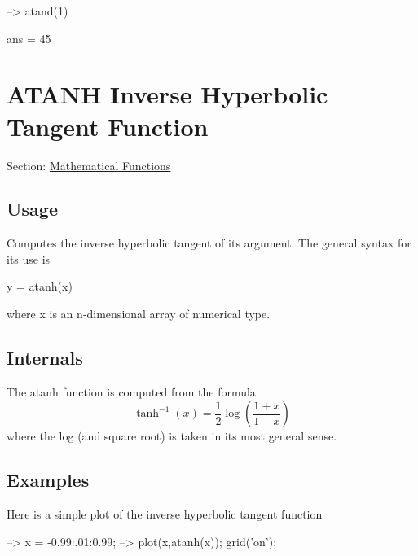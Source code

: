 \begin{DoxyVerbInclude}
--> atand(1)

ans = 
 45 
\end{DoxyVerbInclude}
 \hypertarget{mathfunctions_atanh}{}\section{A\-T\-A\-N\-H Inverse Hyperbolic Tangent Function}\label{mathfunctions_atanh}
Section\-: \hyperlink{sec_mathfunctions}{Mathematical Functions} \hypertarget{vtkwidgets_vtkxyplotwidget_Usage}{}\subsection{Usage}\label{vtkwidgets_vtkxyplotwidget_Usage}
Computes the inverse hyperbolic tangent of its argument. The general syntax for its use is \begin{DoxyVerb}  y = atanh(x)
\end{DoxyVerb}
 where {\ttfamily x} is an {\ttfamily n}-\/dimensional array of numerical type. \hypertarget{transforms_svd_Function}{}\subsection{Internals}\label{transforms_svd_Function}
The {\ttfamily atanh} function is computed from the formula \[ \tanh^{-1}(x) = \frac{1}{2}\log\left(\frac{1+x}{1-x}\right) \] where the {\ttfamily log} (and square root) is taken in its most general sense. \hypertarget{variables_matrix_Examples}{}\subsection{Examples}\label{variables_matrix_Examples}
Here is a simple plot of the inverse hyperbolic tangent function


\begin{DoxyVerbInclude}
--> x = -0.99:.01:0.99;
--> plot(x,atanh(x)); grid('on');
\end{DoxyVerbInclude}


